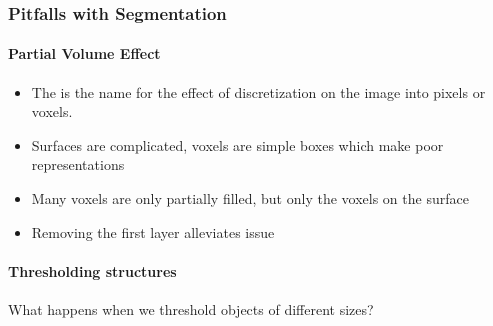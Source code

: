 \documentclass[letterpaper,10pt,english]{sphinxmanual}
\begin{document}
\begin{sphinxVerbatim}[commandchars=\\\{\}]
\PYG{p}{[}\PYG{p}{]} \PYG{p}{[}\PYG{p}{]}
\PYG{p}{[}\PYG{p}{]}

\end{sphinxVerbatim}

\noindent{}


\subsubsection{Pitfalls with Segmentation}
\label{\detokenize{04-BasicSegmentation_Part2:pitfalls-with-segmentation}}

\paragraph{Partial Volume Effect}
\label{\detokenize{04-BasicSegmentation_Part2:partial-volume-effect}}\begin{itemize}
\item {} 
\sphinxAtStartPar
The  is the name for the effect of discretization on the image into pixels or voxels.

\item {} 
\sphinxAtStartPar
Surfaces are complicated, voxels are simple boxes which make poor representations

\item {} 
\sphinxAtStartPar
Many voxels are only partially filled, but only the voxels on the surface

\item {} 
\sphinxAtStartPar
Removing the first layer alleviates issue

\end{itemize}


\paragraph{Thresholding structures}
\label{\detokenize{04-BasicSegmentation_Part2:thresholding-structures}}
\sphinxAtStartPar
What happens when we threshold objects of different sizes?
\end{document}
